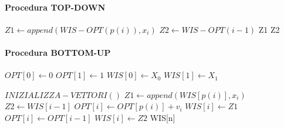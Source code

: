 \pagebreak

\paragraph{Procedura TOP-DOWN}

\begin{algorithm}
    \begin{algorithmic}
                \State {}
                \State {}
            \Else
                \State $Z1 \gets append(WIS-OPT(p(i)), x_i)$
                \State $Z2 \gets WIS-OPT(i - 1)$
                    \State \Return Z1
                \Else
                    \State \Return Z2
                \EndIf
            \EndIf
       \EndProcedure
    \end{algorithmic}
\end{algorithm}

\pagebreak

\paragraph{Procedura BOTTOM-UP}

\begin{algorithm}
    \begin{algorithmic}
            \State $OPT[0] \gets 0$
            \State $OPT[1] \gets 1$
            \State $WIS[0] \gets X_0$
            \State $WIS[1] \gets X_1$
        \EndProcedure
    \end{algorithmic}
\end{algorithm}

\begin{algorithm}
    \begin{algorithmic}
            \State $INIZIALIZZA-VETTORI()$
                \State $Z1 \gets append(WIS[p(i)], x_i)$
                \State $Z2 \gets WIS[i-1]$
                    \State $OPT[i] \gets OPT[p(i)] + v_i$
                    \State $WIS[i] \gets Z1$
                \Else
                    \State $OPT[i] \gets OPT[i-1]$
                    \State $WIS[i] \gets Z2$
                \EndIf
            \EndFor
            \State \Return WIS[n]
        \EndProcedure
    \end{algorithmic}
\end{algorithm}

